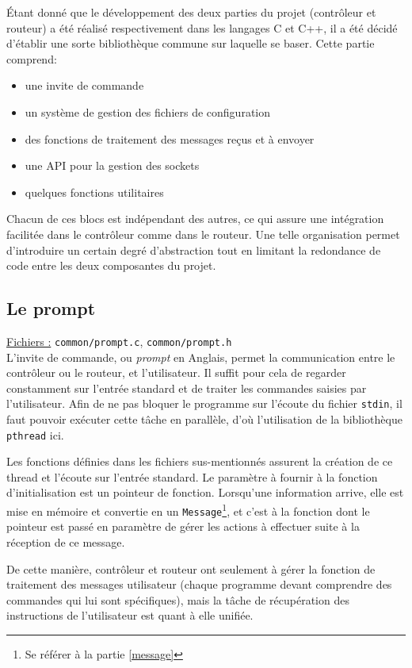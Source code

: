 \documentclass[a4paper,11pt]{article}
\begin{document}
Étant donné que le développement des deux parties du projet (contrôleur et routeur) a été réalisé respectivement dans les langages C et C++, il a été décidé d'établir une sorte bibliothèque commune sur laquelle se baser. Cette partie comprend:
\begin{itemize}
 \item une invite de commande
 \item un système de gestion des fichiers de configuration
 \item des fonctions de traitement des messages reçus et à envoyer
 \item une API pour la gestion des sockets
 \item quelques fonctions utilitaires
\end{itemize}

Chacun de ces blocs est indépendant des autres, ce qui assure une intégration facilitée dans le contrôleur comme dans le routeur. Une telle organisation permet d'introduire un certain degré d'abstraction tout en limitant la redondance
de code entre les deux composantes du projet.

\subsection{Le prompt}

\underline{Fichiers :} \texttt{common/prompt.c}, \texttt{common/prompt.h}\\

L'invite de commande, ou \textit{prompt} en Anglais, permet la communication entre le contrôleur ou le routeur, et l'utilisateur. Il suffit pour cela de regarder constamment sur l'entrée standard et de traiter les commandes saisies par l'utilisateur. Afin de ne pas bloquer le programme sur l'écoute du fichier \texttt{stdin}, il faut pouvoir exécuter cette tâche en parallèle, d'où l'utilisation de la bibliothèque \texttt{pthread} ici.

Les fonctions définies dans les fichiers sus-mentionnés assurent la création de ce thread et l'écoute sur l'entrée standard. Le paramètre à fournir à la fonction d'initialisation est un pointeur de fonction. Lorsqu'une information arrive, elle est mise en mémoire et convertie en un \texttt{Message}\footnote{Se référer à la partie \ref{message}}, et c'est à la fonction dont le pointeur est passé en paramètre de gérer les actions à effectuer suite à la réception de ce message.

De cette manière, contrôleur et routeur ont seulement à gérer la fonction de traitement des messages utilisateur (chaque programme devant comprendre des commandes qui lui sont spécifiques), mais la tâche de récupération des instructions de l'utilisateur est quant à elle unifiée.
\end{document}
